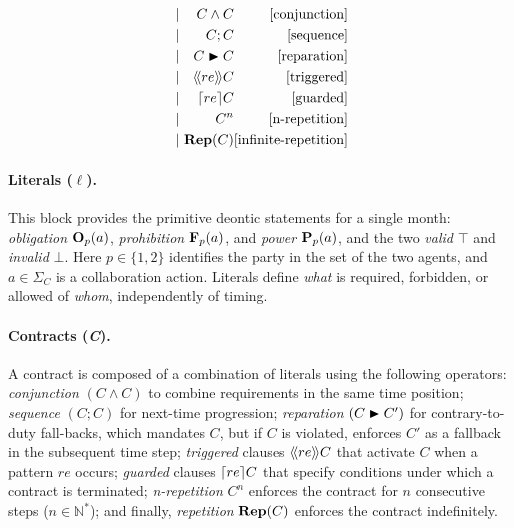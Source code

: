 \begin{figure}
{\begin{minipage}{0.96\textwidth}
\[\begin{alignedat}{3}
    &\mid&\ C \wedge C                              && \hfill[\text{conjunction}] \\
    &\mid&\ C ; C                                   && \hfill[\text{sequence}] \\
    &\mid&\ C \repair C                             && \hfill[\text{reparation}] \\
    &\mid&\ \trig[re]{C}                   && \hfill[\text{triggered}] \\
    &\mid&\ \guard[re]{C}                           && \hfill[\text{guarded}] \\
    &\mid&\ C^n                                     && \hfill[\text{n-repetition}]\\
    &\mid&\ \repit{C}                               && \hfill[\text{infinite-repetition}]
  \end{alignedat}
  \]
  \end{minipage}}
  \end{figure}
  
 
  \paragraph{Literals (\emph{\(\ell\)}).}
  This block provides the primitive deontic statements for a single month:
  \emph{obligation} \(\obl[p]{a}\), \emph{prohibition} \(\frb[p]{a}\), and \emph{power} \(\perm[p]{a}\), and the two \emph{valid} \(\top\) and \emph{invalid} \(\bot\).
  Here \(p \in \{1,2\}\) identifies the party in the set of the two agents, and \(a \in \Sigma_C\) is a collaboration action.
  Literals define \emph{what} is required, forbidden, or allowed of \emph{whom}, independently of timing. 

  \paragraph{Contracts (\emph{C}).}

A contract is composed of a combination of literals using the following operators:
\emph{conjunction} \((C \wedge C)\) to combine requirements in the same time position;
\emph{sequence} \((C;C)\) for next-time progression;
\emph{reparation} \((C \repair C')\) for contrary-to-duty fall-backs, which mandates $C$, but if $C$ is violated, enforces $C'$ as a fallback in the subsequent time step;
\emph{triggered} clauses \(\trig[re]{C}\) that activate \(C\) when a pattern \(re\) occurs;
\emph{guarded} clauses \(\guard[re]{C}\) that specify conditions under which a contract is terminated; 
\emph{n-repetition} \(C^n\) enforces the contract for \(n\) consecutive steps (\(n \in \mathbb{N^*}\)); and finally, \emph{repetition} \(\repit{C}\) enforces the contract indefinitely.

